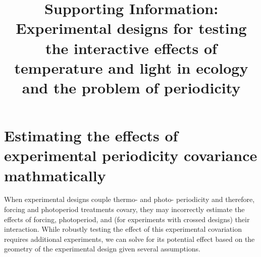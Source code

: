\documentclass[11pt]{article}
\title{Supporting Information: Experimental designs for testing the interactive effects of temperature and light in ecology and the problem of periodicity }
\date{}
\begin{document}
\maketitle

\section*{Estimating the effects of experimental periodicity covariance mathmatically}
When experimental designs couple thermo- and photo- periodicity and therefore, forcing and photoperiod treatments covary, they may incorrectly estimate the effects of forcing, photoperiod, and (for experiments with crossed designs) their interaction. While robustly testing the effect of this experimental covariation requires additional experiments, we can solve for its potential effect based on the geometry of the experimental design given several assumptions.
\end{document}
